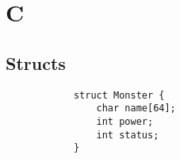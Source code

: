 \section{C}
	\subsection{Structs}
		\begin{lstlisting}
			struct Monster {
				char name[64];
				int power;
				int status;
			}
		\end{lstlisting}
